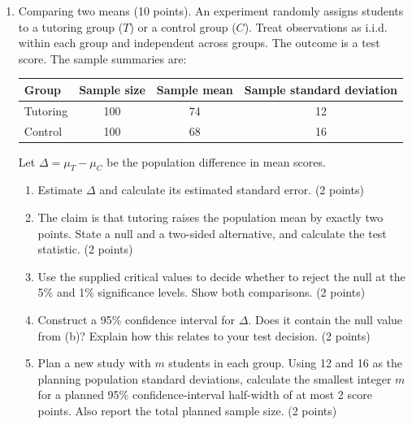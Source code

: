 \documentclass[a4paper,11pt,twoside]{article}
\begin{document}
\begin{enumerate}[label=\arabic*.,leftmargin=*,itemsep=5pt,topsep=4pt,parsep=0pt,start=9]
\item Comparing two means (10 points).
An experiment randomly assigns students to a tutoring group ($T$) or a control
group ($C$). Treat observations as i.i.d. within each group and independent across groups.
The outcome is a test score. The sample summaries are:
\begin{center}
\begin{tabular}{lccc}
Group & Sample size & Sample mean & Sample standard deviation \\ \hline
Tutoring & 100 & 74 & 12 \\
Control & 100 & 68 & 16
\end{tabular}
\end{center}
Let $\Delta=\mu_T-\mu_C$ be the population difference in mean scores.
\begin{enumerate}[label=(\alph*),leftmargin=*,itemsep=2pt,topsep=2pt]
\item Estimate $\Delta$ and calculate its estimated standard error. (2 points)
\item The claim is that tutoring raises the population mean by exactly two
points. State a null and a two-sided alternative, and calculate the test
statistic. (2 points)
\item Use the supplied critical values to decide whether to reject the null
at the 5\% and 1\% significance levels. Show both comparisons. (2 points)
\item Construct a 95\% confidence interval for $\Delta$. Does it contain the
null value from (b)? Explain how this relates to your test decision. (2 points)
\item Plan a new study with $m$ students in each group. Using 12 and 16 as the
planning population standard deviations, calculate the smallest integer $m$
for a planned 95\% confidence-interval half-width of at most 2 score points.
Also report the total planned sample size. (2 points)
\end{enumerate}


\end{enumerate}
\end{document}
